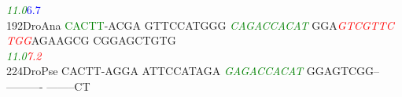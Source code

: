\documentclass[11pt,twoside,reqno,a4paper]{article}
\begin{document}
{\hspace*{4\charwidth}\hspace*{7\charwidth}\hspace*{1\charwidth}\hspace*{1\charwidth}\hspace*{20\charwidth}\textit{\textcolor{green}{11.0}}\hspace*{1\charwidth}\hspace*{1\charwidth}\hspace*{16\charwidth}\textcolor{blue}{6.7}\hspace*{1\charwidth}\hspace*{1\charwidth}\\
192\hspace*{1\charwidth}DroAna	\textcolor{green}{C}\textcolor{green}{A}\textcolor{green}{C}\textcolor{green}{T}\textcolor{green}{T}-ACGA	GTTCCATGGG	\textit{\textcolor{green}{C}}\textit{\textcolor{green}{A}}\textit{\textcolor{green}{G}}\textit{\textcolor{green}{A}}\textit{\textcolor{green}{C}}\textit{\textcolor{green}{C}}\textit{\textcolor{green}{A}}\textit{\textcolor{green}{C}}\textit{\textcolor{green}{A}}\textit{\textcolor{green}{T}}	GGA\textit{\textcolor{red}{G}}\textit{\textcolor{red}{T}}\textit{\textcolor{red}{C}}\textit{\textcolor{red}{G}}\textit{\textcolor{red}{T}}\textit{\textcolor{red}{T}}\textit{\textcolor{red}{C}}	\textit{\textcolor{red}{T}}\textit{\textcolor{red}{G}}\textit{\textcolor{red}{G}}AGAAGCG	CGGAGCTGTG	\\
\hspace*{4\charwidth}\hspace*{7\charwidth}\hspace*{1\charwidth}\hspace*{1\charwidth}\hspace*{20\charwidth}\textit{\textcolor{green}{11.0}}\hspace*{1\charwidth}\hspace*{9\charwidth}\textit{\textcolor{red}{7.2}}\hspace*{1\charwidth}\hspace*{1\charwidth}\hspace*{1\charwidth}\\
224\hspace*{1\charwidth}DroPse	CACTT-AGGA	ATTCCATAGA	\textit{\textcolor{green}{G}}\textit{\textcolor{green}{A}}\textit{\textcolor{green}{G}}\textit{\textcolor{green}{A}}\textit{\textcolor{green}{C}}\textit{\textcolor{green}{C}}\textit{\textcolor{green}{A}}\textit{\textcolor{green}{C}}\textit{\textcolor{green}{A}}\textit{\textcolor{green}{T}}	GGAGTCGG--	----------	--------CT	\\
}
\end{document}
